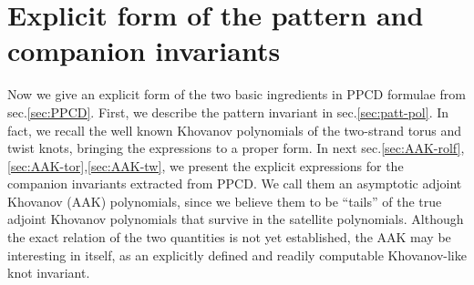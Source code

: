 \documentclass[11pt]{article}
\begin{document}
\section{Explicit form of the pattern and companion invariants\label{sec:AAK}}
Now we give an explicit form of the two basic ingredients in PPCD formulae from sec.\ref{sec:PPCD}. First, we describe the pattern invariant in sec.\ref{sec:patt-pol}. In fact, we recall the well known Khovanov polynomials of the two-strand torus and twist knots, bringing the expressions to a proper form. In next sec.\ref{sec:AAK-rolf},\ref{sec:AAK-tor},\ref{sec:AAK-tw}, we present the explicit expressions for the companion invariants extracted from PPCD. We call them an asymptotic adjoint Khovanov (AAK) polynomials, since we believe them to be ``tails'' of the true adjoint Khovanov polynomials that survive in the satellite polynomials. Although the exact relation of the two quantities is not yet established, the AAK may be interesting in itself, as an explicitly defined and readily computable Khovanov-like knot invariant. 
\end{document}
